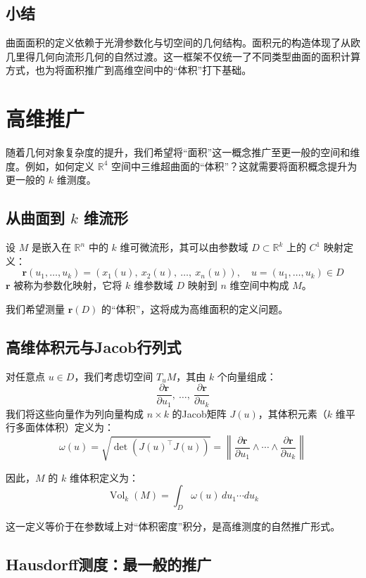 \documentclass[a4paper, oneside]{article}
\begin{document}
\subsection{小结}

曲面面积的定义依赖于光滑参数化与切空间的几何结构。面积元的构造体现了从欧几里得几何向流形几何的自然过渡。这一框架不仅统一了不同类型曲面的面积计算方式，也为将面积推广到高维空间中的“体积”打下基础。

\section{高维推广}

随着几何对象复杂度的提升，我们希望将“面积”这一概念推广至更一般的空间和维度。例如，如何定义 $\mathbb{R}^4$ 空间中三维超曲面的“体积”？这就需要将面积概念提升为更一般的 $k$ 维测度。

\subsection{从曲面到 $k$ 维流形}

设 $M$ 是嵌入在 $\mathbb{R}^n$ 中的 $k$ 维可微流形，其可以由参数域 $D \subset \mathbb{R}^k$ 上的 $C^1$ 映射定义：
\[
\boldsymbol{r}(u_1, \dots, u_k) = (x_1(u),\ x_2(u),\ \dots,\ x_n(u)),\quad u = (u_1, \dots, u_k) \in D
\]
$\boldsymbol{r}$ 被称为参数化映射，它将 $k$ 维参数域 $D$ 映射到 $n$ 维空间中构成 $M$。

我们希望测量 $\boldsymbol{r}(D)$ 的“体积”，这将成为高维面积的定义问题。

\subsection{高维体积元与Jacob行列式}

对任意点 $u \in D$，我们考虑切空间 $T_u M$，其由 $k$ 个向量组成：
\[
\frac{\partial \boldsymbol{r}}{\partial u_1},\ \dots,\ \frac{\partial \boldsymbol{r}}{\partial u_k}
\]
我们将这些向量作为列向量构成 $n \times k$ 的Jacob矩阵 $J(u)$，其体积元素（$k$ 维平行多面体体积）定义为：
\[
\omega(u) = \sqrt{\det \left( J(u)^\top J(u) \right)} = \left\| \frac{\partial \boldsymbol{r}}{\partial u_1} \wedge \cdots \wedge \frac{\partial \boldsymbol{r}}{\partial u_k} \right\|
\]

因此，$M$ 的 $k$ 维体积定义为：
\[
\operatorname{Vol}_k(M) = \int_D \omega(u) \, du_1 \cdots du_k
\]

这一定义等价于在参数域上对“体积密度”积分，是高维测度的自然推广形式。

\subsection{Hausdorff测度：最一般的推广}
\end{document}
